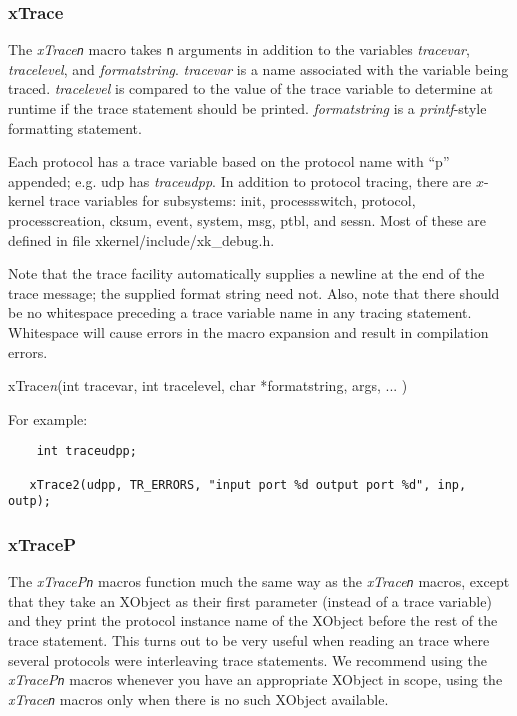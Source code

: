 \subsubsection{xTrace}

The {\em xTrace{\tt n}} macro takes {\tt n} arguments in addition to
the variables {\em tracevar}, {\em tracelevel}, and {\em
formatstring}.  {\em tracevar} is a name associated with the variable
being traced.  {\em tracelevel} is compared to the value of the trace
variable to determine at runtime if the trace statement should be
printed. {\em formatstring} is a {\em printf}-style formatting statement.

Each protocol has a trace variable based on the protocol name with
``p'' appended; e.g. udp has {\em traceudpp}.  In addition to protocol
tracing, there are $x$-kernel trace variables for subsystems: init,
processswitch, protocol, processcreation, cksum, event, system, msg,
ptbl, and sessn.  Most of these are defined in file {\sanss
xkernel/include/xk\_debug.h}.

Note that the trace facility automatically supplies a newline at the
end of the trace message; the supplied format string need not.  Also,
note that there should be no whitespace preceding a trace variable
name in any tracing statement.  Whitespace will cause errors in the
macro expansion and result in compilation errors.
\medskip

{\bold xTrace}{\em n}({\sem int} {\caps tracevar}, {\sem int} {\caps
tracelevel}, {\sem char} *{\caps formatstring}, {\caps args, ...} )
\medskip

\noindent For example:

\begin{verbatim}
	int traceudpp;

   xTrace2(udpp, TR_ERRORS, "input port %d output port %d", inp, outp);
\end{verbatim}


\subsubsection{xTraceP}

The {\em xTraceP{\tt n}} macros function much the same way as the 
{\em xTrace{\tt n}} macros, except that they take an XObject as their
first parameter (instead of a trace variable) and they print the
protocol instance name of the XObject before the rest of the trace
statement.  This turns out to be very useful when reading an \xk{}
trace where several protocols were interleaving trace statements.  We
recommend using the {\em xTraceP{\tt n}} macros whenever you have an
appropriate XObject in scope, using the {\em xTrace{\tt n}} macros
only when there is no such XObject available.

